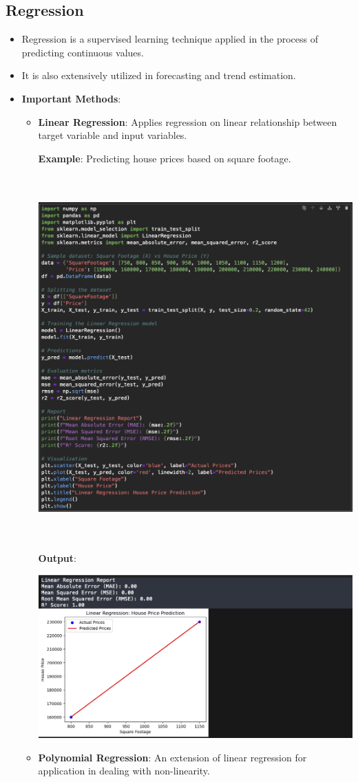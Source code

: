 \documentclass{article}
\begin{document}
\subsection{Regression}
\begin{itemize}
    \item Regression is a supervised learning technique applied in the process of predicting continuous values.
    \item It is also extensively utilized in forecasting and trend estimation.
    \item \textbf{Important Methods}:
    \begin{itemize}
    \item \textbf{Linear Regression}: Applies regression on linear relationship between target variable and input variables.
    
    \textbf{Example}: Predicting house prices based on square footage.

    \includegraphics[width=14cm,height=14cm]{Linear.png}

\textbf{Output}:

\includegraphics[width=14cm,height=6
cm]{Linear_Output.png}
    \item \textbf{Polynomial Regression}: An extension of linear regression for application in dealing with non-linearity.
    

\end{itemize}
\end{itemize}
\end{document}
